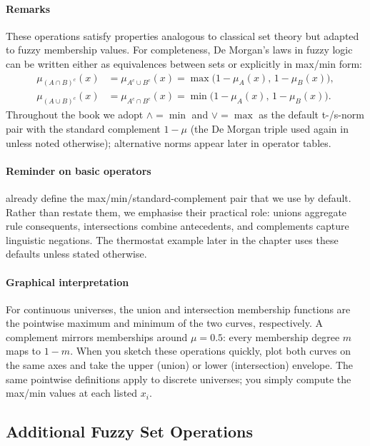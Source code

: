 \paragraph{Remarks}
These operations satisfy properties analogous to classical set theory but adapted to fuzzy membership values. For completeness, De Morgan's laws in fuzzy logic can be written either as equivalences between sets or explicitly in max/min form:
\begin{align*}
    \mu_{(A \cap B)^c}(x) &= \mu_{A^c \cup B^c}(x) = \max\big(1-\mu_A(x),\,1-\mu_B(x)\big), \\
    \mu_{(A \cup B)^c}(x) &= \mu_{A^c \cap B^c}(x) = \min\big(1-\mu_A(x),\,1-\mu_B(x)\big).
\end{align*}
Throughout the book we adopt $\wedge=\min$ and $\vee=\max$ as the default t-/s\hyp{}norm pair with the standard complement \(1-\mu\) (the De Morgan triple used again in  unless noted otherwise); alternative norms appear later in operator tables.

\paragraph{Reminder on basic operators}

 already define the max/min/standard-complement pair that we use by default. Rather than restate them, we emphasise their practical role: unions aggregate rule consequents, intersections combine antecedents, and complements capture linguistic negations. The thermostat example later in the chapter uses these defaults unless stated otherwise.

\paragraph{Graphical interpretation}
\label{sec:fuzzysets_graphical_interpretation}
For continuous universes, the union and intersection membership functions are the pointwise maximum and minimum of the two curves, respectively. A complement mirrors memberships around \(\mu=0.5\): every membership degree \(m\) maps to \(1-m\). When you sketch these operations quickly, plot both curves on the same axes and take the upper (union) or lower (intersection) envelope. The same pointwise definitions apply to discrete universes; you simply compute the max/min values at each listed \(x_i\).

\subsection{Additional Fuzzy Set Operations}
\label{sec:fuzzysets_additional_fuzzy_set_operations}

